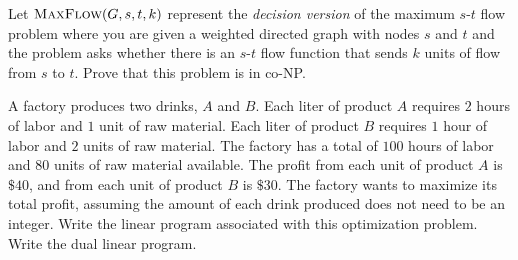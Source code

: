 \documentclass[11  pt]{exam}
\begin{document}
\begin{questions}
	
	\question Let $\textsc{MaxFlow}(G,s,t,k)$ represent the \emph{decision version} of the maximum $s$-$t$ flow problem where you are given a weighted directed graph with nodes $s$ and $t$ and the problem asks whether there is an $s$-$t$ flow function that sends $k$ units of flow from $s$ to $t$. Prove that this problem is in co-NP.
	
	
	\question A factory produces two drinks, $A$ and $B$. Each liter of product $A$ requires $2$ hours of labor and $1$ unit of raw material. Each liter of product $B$ requires $1$ hour of labor and $2$ units of raw material. The factory has a total of $100$ hours of labor and $80$ units of raw material available. The profit from each unit of product $A$ is $\$40$, and from each unit of product $B$ is $\$30$. The factory wants to maximize its total profit, assuming the amount of each drink produced does not need to be an integer. Write the linear program associated with this optimization problem. Write the dual linear program. 
	
\end{questions}
\end{document}
